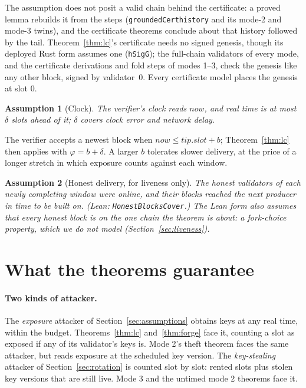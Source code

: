 \documentclass[10pt]{article}
\newtheorem{assumption}{Assumption}
\DeclareRobustCommand{\code}[1]{{\renewcommand{\_}{\textunderscore\allowbreak}\texttt{#1}}}
\begin{document}
The assumption does not posit a valid chain behind the certificate: a
proved lemma rebuilds it from the steps (\code{groundedCert\_history}
and its mode-2 and mode-3 twins), and the certificate theorems conclude
about that history followed by the tail. Theorem~\ref{thm:lc}'s
certificate needs no signed genesis, though its deployed Rust form
assumes one (\code{hSigG}); the full-chain validators of every
mode, and the certificate derivations and fold steps of modes 1--3,
check the genesis like any other block, signed by validator~0. Every
certificate model places the genesis at slot $0$.

\begin{assumption}[Clock]\label{ass:clock}
The verifier's clock reads $\mathit{now}$, and real time is at most
$\delta$ slots ahead of it; $\delta$ covers clock error and network delay.
\end{assumption}

The verifier accepts a newest block when $\mathit{now} \le
\mathit{tip.slot} + b$; Theorem~\ref{thm:lc} then applies with
$\varphi = b + \delta$. A larger $b$ tolerates slower delivery, at the
price of a longer stretch in which exposure counts against each window.

\begin{assumption}[Honest delivery, for liveness only]\label{ass:delivery}
The honest validators of each newly completing window were online, and
their blocks reached the next producer in time to be built on.
\quad\textit{(Lean: \code{HonestBlocksCover}.)} The Lean form also
assumes that every honest block is on the one chain the theorem is
about: a fork-choice property, which we do not model
(Section~\ref{sec:liveness}).
\end{assumption}

\section{What the theorems guarantee}
\label{sec:results}

\paragraph{Two kinds of attacker.} The \emph{exposure} attacker of
Section~\ref{sec:assumptions} obtains keys at any real time, within the
budget. Theorems~\ref{thm:lc} and~\ref{thm:forge} face it, counting a
slot as exposed if any of its validator's keys is. Mode 2's theft
theorem faces the same attacker, but reads exposure at the scheduled key
version. The \emph{key-stealing} attacker of Section~\ref{sec:rotation}
is counted slot by slot: rented slots plus stolen key versions that are
still live. Mode 3 and the untimed mode 2 theorems face it.
\end{document}

